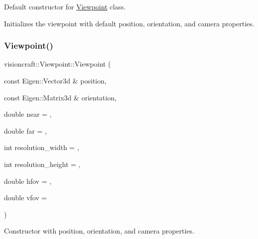 Default constructor for \hyperlink{classvisioncraft_1_1Viewpoint}{Viewpoint} class. 

Initializes the viewpoint with default position, orientation, and camera properties. \mbox{\label{classvisioncraft_1_1Viewpoint_a801252e99e7abe9ec2fa90e0f453c864}} 
\subsubsection{\texorpdfstring{Viewpoint()}{Viewpoint()}\hspace{0.1cm}{\footnotesize\ttfamily [2/4]}}
{\footnotesize\ttfamily visioncraft\+::\+Viewpoint\+::\+Viewpoint (\begin{DoxyParamCaption}\item[{const Eigen\+::\+Vector3d \&}]{position,  }\item[{const Eigen\+::\+Matrix3d \&}]{orientation,  }\item[{double}]{near = {},  }\item[{double}]{far = {},  }\item[{int}]{resolution\+\_\+width = {},  }\item[{int}]{resolution\+\_\+height = {},  }\item[{double}]{hfov = {},  }\item[{double}]{vfov = {} }\end{DoxyParamCaption})}



Constructor with position, orientation, and camera properties. 


